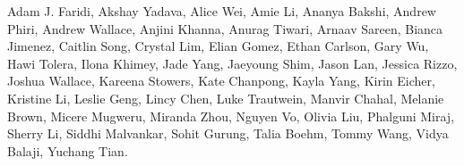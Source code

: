 Adam J. Faridi,
Akshay Yadava,
Alice Wei,
Amie Li,
Ananya Bakshi,
Andrew Phiri,
Andrew Wallace,
Anjini Khanna,
Anurag Tiwari,
Arnaav Sareen,
Bianca Jimenez,
Caitlin Song,
Crystal Lim,
Elian Gomez,
Ethan Carlson,
Gary Wu,
Hawi Tolera,
Ilona Khimey,
Jade Yang,
Jaeyoung Shim,
Jason Lan,
Jessica Rizzo,
Joshua Wallace,
Kareena Stowers,
Kate Chanpong,
Kayla Yang,
Kirin Eicher,
Kristine Li,
Leslie Geng,
Lincy Chen,
Luke Trautwein,
Manvir Chahal,
Melanie Brown,
Micere Mugweru,
Miranda Zhou,
Nguyen Vo,
Olivia Liu,
Phalguni Miraj,
Sherry Li,
Siddhi Malvankar,
Sohit Gurung,
Talia Boehm,
Tommy Wang,
Vidya Balaji,
Yuchang Tian.

